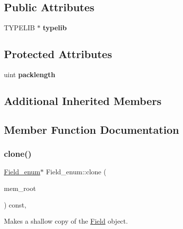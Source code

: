 \subsection*{Public Attributes}
\begin{DoxyCompactItemize}
\item 
\mbox{\label{classField__enum_a478fd1c36b0a3e945f164251e80f41df}} 
T\+Y\+P\+E\+L\+IB $\ast$ {\bfseries typelib}
\end{DoxyCompactItemize}
\subsection*{Protected Attributes}
\begin{DoxyCompactItemize}
\item 
\mbox{\label{classField__enum_a5a2844871cb2f4314eae3aa2033853b1}} 
uint {\bfseries packlength}
\end{DoxyCompactItemize}
\subsection*{Additional Inherited Members}


\subsection{Member Function Documentation}
\mbox{\label{classField__enum_a47e937e56eb39c90f99f19379939d9a8}} 
\subsubsection{\texorpdfstring{clone()}{clone()}\hspace{0.1cm}{\footnotesize\ttfamily [1/2]}}
{\footnotesize\ttfamily \mbox{\hyperlink{classField__enum}{Field\+\_\+enum}}$\ast$ Field\+\_\+enum\+::clone (\begin{DoxyParamCaption}\item[{M\+E\+M\+\_\+\+R\+O\+OT $\ast$}]{mem\+\_\+root }\end{DoxyParamCaption}) const\hspace{0.3cm}{\ttfamily [inline]}, {\ttfamily [virtual]}}

Makes a shallow copy of the \mbox{\hyperlink{classField}{Field}} object.

